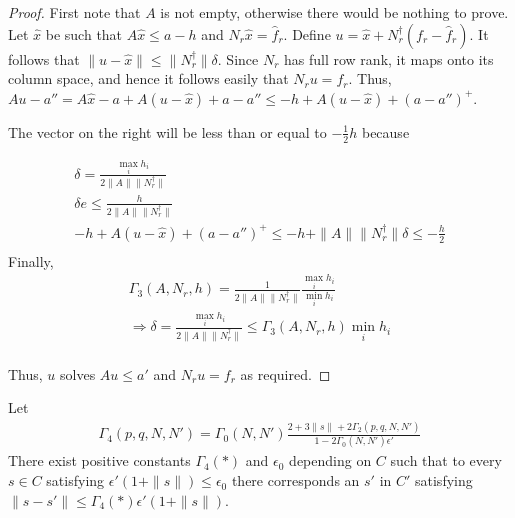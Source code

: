 \begin{proof}
First note that $A$ is not empty, otherwise there would be nothing to prove.
Let $\hat x $ be such that $A\hat x \le a - h$ and $N_r \hat x = \hat f_r$.
Define $u = \hat x + N_r^{\dagger}(f_r - \hat f_r)$.
It follows that $\|u - \hat x\| \le \|N_r^{\dagger}\|\delta$.
Since $N_r$ has full row rank, it maps onto its column space, and hence it follows easily that
$N_r u = f_r$.
Thus, $Au - a'' = A\hat x - a + A(u - \hat x) + a - a'' \le -h + A(u - \hat x) + (a - a'')^+$.


The vector on the right will be less than or equal to $-\frac 1 2 h$ because

\begin{align*}
\delta = \frac{\max_i h_i}{2\|A\|\|N_r^{\dagger}\|} \\
\delta e \le \frac h {2\|A\|\|N_r^{\dagger}\|} \\
-h + A(u - \hat x) + (a - a'')^+ \le -h + \|A\|\|N_r^{\dagger}\|\delta \le -\frac h 2 \\
\end{align*}
Finally,
\begin{align*}
\Gamma_3(A, N_r, h) = \frac{1}{2\|A\|\|N_r^{\dagger}\|}\frac{\max_i h_i}{\min_ih_i} \\
\Longrightarrow \delta = \frac{\max_i h_i}{2\|A\|\|N_r^{\dagger}\|} \le \Gamma_3(A, N_r, h)\min_ih_i \\
\end{align*}

Thus, $u$ solves $A u \le a'$ and $N_ru = f_r$ as required.

\end{proof}



\begin{theorem}
\label{4_2}
Let
\begin{align*}
\Gamma_4(p, q, N, N') =  \Gamma_0(N, N')\frac{2 + 3\|s\| + 2\Gamma_2(p, q, N, N')}{1-2\Gamma_0(N, N')\epsilon'}
\end{align*}
There exist positive constants $\Gamma_4(*)$ and $\epsilon_0$ depending on $C$ such that to every $s \in C$ satisfying $\epsilon'(1 + \|s\|) \le \epsilon_0$ there corresponds an $s'$ in $C'$ satisfying 
$\|s - s'\|\le \Gamma_4(*) \epsilon'(1 + \|s\|)$.
\end{theorem}

